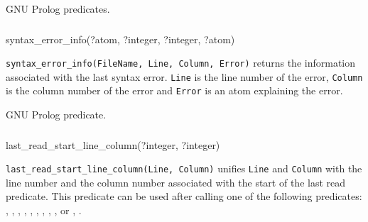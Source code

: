 \Portability

GNU Prolog predicates.

\subsubsection{\label{syntax-error-info/4}}

\begin{TemplatesOneCol}
syntax\_error\_info(?atom, ?integer, ?integer, ?atom)

\end{TemplatesOneCol}

\Description

\texttt{syntax\_error\_info(FileName, Line, Column, Error)} returns the
information associated with the last syntax error. \texttt{Line} is the line
number of the error, \texttt{Column} is the column number of the error and
\texttt{Error} is an atom explaining the error.

\begin{PlErrors}





\end{PlErrors}

\Portability

GNU Prolog predicate.

\subsubsection{}

\begin{TemplatesOneCol}
last\_read\_start\_line\_column(?integer, ?integer)

\end{TemplatesOneCol}

\Description

\texttt{last\_read\_start\_line\_column(Line, Column)} unifies \texttt{Line}
and \texttt{Column} with the line number and the column number associated with
the start of the last read predicate. This predicate can be used after
calling one of the following predicates: ,
, , 
, , ,
, , ,
  or ,
 .

